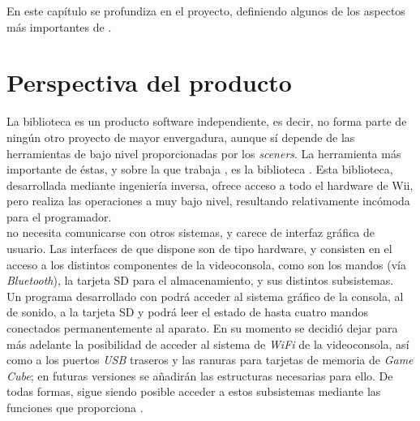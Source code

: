 



En este capítulo se profundiza en el proyecto, definiendo algunos de los aspectos más importantes de .

\section{Perspectiva del producto}

La biblioteca es un producto software independiente, es decir, no forma parte de ningún otro proyecto de mayor envergadura, aunque sí depende de las herramientas de bajo nivel proporcionadas por los \emph{sceners}. La herramienta más importante de éstas, y sobre la que trabaja , es la biblioteca . Esta biblioteca, desarrollada mediante ingeniería inversa, ofrece acceso a todo el hardware de Wii, pero realiza las operaciones a muy bajo nivel, resultando relativamente incómoda para el programador.\\

 no necesita comunicarse con otros sistemas, y carece de interfaz gráfica de usuario. Las interfaces de que dispone son de tipo hardware, y consisten en el acceso a los distintos componentes de la videoconsola, como son los mandos (vía \emph{Bluetooth}), la tarjeta SD para el almacenamiento, y sus distintos subsistemas.\\

Un programa desarrollado con  podrá acceder al sistema gráfico de la consola, al de sonido, a la tarjeta SD y podrá leer el estado de hasta cuatro mandos conectados permanentemente al aparato. En su momento se decidió dejar para más adelante la posibilidad de acceder al sistema de \emph{WiFi} de la videoconsola, así como a los puertos \emph{USB} traseros y las ranuras para tarjetas de memoria de \emph{Game Cube}; en futuras versiones se añadirán las estructuras necesarias para ello. De todas formas, sigue siendo posible acceder a estos subsistemas mediante las funciones que proporciona .\\

